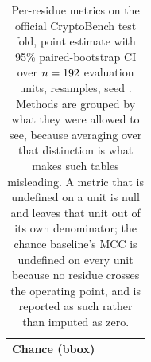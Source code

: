 \documentclass[11pt]{article}
\begin{document}
\begin{table}[h]
\begin{tabular}{@{}lllll@{}}
Chance (bbox)         & \RandAuc{} \RandAucCI{} & \RandPr{} \RandPrCI{}
                      & \RandMcc{} & \RandFOne{} \RandFOneCI{}\\
\bottomrule
\end{tabular}
\caption{Per-residue metrics on the official CryptoBench test fold, point
estimate with 95\% paired-bootstrap CI over \(n=192{}\) evaluation units,
\NBoot{} resamples, seed \BootSeed{}. Methods are grouped by what they were
allowed to see, because averaging over that distinction is what makes such
tables misleading. A metric that is undefined on a unit is null and leaves that
unit out of its own denominator; the chance baseline's MCC is undefined on every
unit because no residue crosses the operating point, and is reported as such
rather than imputed as zero.}
\label{tab:metrics}
\end{table}
\end{document}
